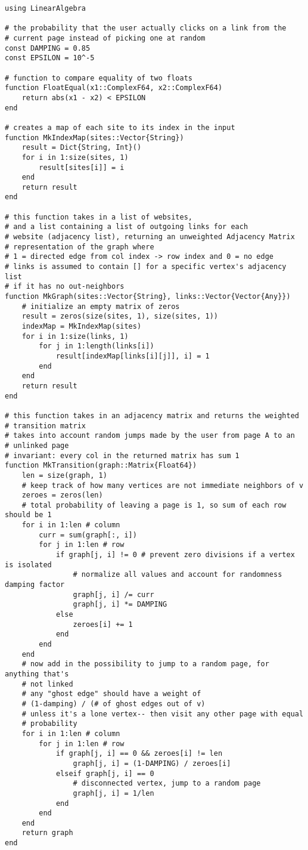 \documentclass{article}
\begin{document}
\begin{verbatim}
using LinearAlgebra

# the probability that the user actually clicks on a link from the 
# current page instead of picking one at random
const DAMPING = 0.85
const EPSILON = 10^-5

# function to compare equality of two floats
function FloatEqual(x1::ComplexF64, x2::ComplexF64)
    return abs(x1 - x2) < EPSILON
end

# creates a map of each site to its index in the input
function MkIndexMap(sites::Vector{String}) 
    result = Dict{String, Int}()
    for i in 1:size(sites, 1)
        result[sites[i]] = i
    end
    return result
end

# this function takes in a list of websites, 
# and a list containing a list of outgoing links for each 
# website (adjacency list), returning an unweighted Adjacency Matrix 
# representation of the graph where 
# 1 = directed edge from col index -> row index and 0 = no edge
# links is assumed to contain [] for a specific vertex's adjacency list 
# if it has no out-neighbors
function MkGraph(sites::Vector{String}, links::Vector{Vector{Any}})
    # initialize an empty matrix of zeros
    result = zeros(size(sites, 1), size(sites, 1))
    indexMap = MkIndexMap(sites)
    for i in 1:size(links, 1)
        for j in 1:length(links[i])
            result[indexMap[links[i][j]], i] = 1
        end
    end
    return result
end    

# this function takes in an adjacency matrix and returns the weighted 
# transition matrix
# takes into account random jumps made by the user from page A to an 
# unlinked page
# invariant: every col in the returned matrix has sum 1
function MkTransition(graph::Matrix{Float64})
    len = size(graph, 1)
    # keep track of how many vertices are not immediate neighbors of v
    zeroes = zeros(len)
    # total probability of leaving a page is 1, so sum of each row should be 1
    for i in 1:len # column
        curr = sum(graph[:, i])
        for j in 1:len # row
            if graph[j, i] != 0 # prevent zero divisions if a vertex is isolated
                # normalize all values and account for randomness damping factor
                graph[j, i] /= curr
                graph[j, i] *= DAMPING
            else
                zeroes[i] += 1
            end
        end
    end
    # now add in the possibility to jump to a random page, for anything that's 
    # not linked
    # any "ghost edge" should have a weight of 
    # (1-damping) / (# of ghost edges out of v)
    # unless it's a lone vertex-- then visit any other page with equal 
    # probability
    for i in 1:len # column
        for j in 1:len # row
            if graph[j, i] == 0 && zeroes[i] != len
                graph[j, i] = (1-DAMPING) / zeroes[i]
            elseif graph[j, i] == 0
                # disconnected vertex, jump to a random page
                graph[j, i] = 1/len
            end
        end
    end
    return graph
end


\end{verbatim}
\end{document}
